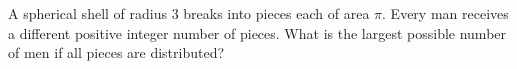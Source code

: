 A spherical shell of radius 3 breaks into pieces each of area $\pi$. Every man receives a different positive integer number of pieces. What is the largest possible number of men if all pieces are distributed?
